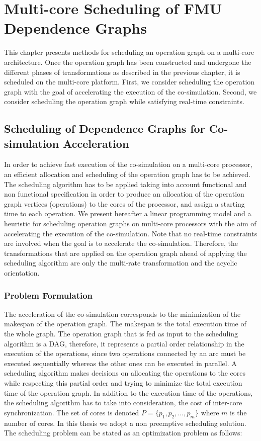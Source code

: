 \chapter{\label{ch:5-sched}Multi-core Scheduling of FMU Dependence Graphs} 

\minitoc

This chapter presents methods for scheduling an operation graph on a multi-core architecture. Once the operation graph has been constructed and undergone the different phases of transformations as described in the previous chapter, it is scheduled on the multi-core platform. First, we consider scheduling the operation graph with the goal of accelerating the execution of the co-simulation. Second, we consider scheduling the operation graph while satisfying real-time constraints.  

\section{Scheduling of Dependence Graphs for Co-simulation Acceleration}

In order to achieve fast execution of the co-simulation on a multi-core processor, an efficient allocation and scheduling of the operation graph has to be achieved. The scheduling algorithm has to be applied taking into account functional and non functional specification in order to produce an allocation of the operation graph vertices (operations) to the cores of the processor, and assign a starting time to each operation. We present hereafter a linear programming model and a heuristic for scheduling operation graphs on multi-core processors with the aim of accelerating the execution of the co-simulation. Note that no real-time constraints are involved when the goal is to accelerate the co-simulation. Therefore, the transformations that are applied on the operation graph ahead of applying the scheduling algorithm are only the multi-rate transformation and the acyclic orientation. 

\subsection{\label{5:shed-prob}Problem Formulation}

The acceleration of the co-simulation corresponds to the minimization of the makespan of the operation graph. The makespan is the total execution time of the whole graph. The operation graph that is fed as input to the scheduling algorithm is a DAG, therefore, it represents a partial order relationship in the execution of the operations, since two operations connected by an arc must be executed sequentially whereas the other ones can be executed in parallel. A scheduling algorithm makes decisions on allocating the operations to the cores while respecting this partial order and trying to minimize the total execution time of the operation graph. In addition to the execution time of the operations, the scheduling algorithm has to take into consideration, the cost of inter-core synchronization. The set of cores is denoted $P = \{p_1, p_2, \ldots, p_m\}$ where $m$ is the number of cores. In this thesis we adopt a non preemptive scheduling solution. The scheduling problem can be stated as an optimization problem as follows:

